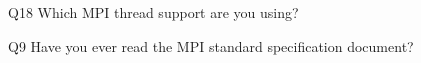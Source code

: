 \begin{description}%
\item{Q18} Which MPI thread support are you using?%
\item{Q9} Have you ever read the MPI standard specification document?%
\end{description}%
